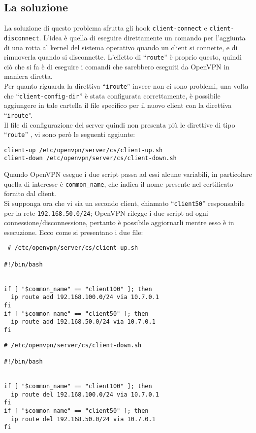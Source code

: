 \subsection{La soluzione}
La soluzione di questo problema sfrutta gli hook \texttt{client-connect} e
\texttt{client-disconnect}. L'idea è
quella di eseguire direttamente un comando per l'aggiunta di una rotta al
kernel del sistema operativo quando un client si connette, e di rimuoverla quando
si disconnette. L'effetto di ``\texttt{route}'' è proprio questo, quindi ciò che si fa
è di eseguire i comandi che sarebbero eseguiti da OpenVPN in maniera diretta.\\
Per quanto riguarda la direttiva ``\texttt{iroute}'' invece non ci sono problemi,
una volta che ``\texttt{client-config-dir}'' è stata configurata correttamente, è
possibile aggiungere in tale cartella il file specifico per il nuovo client con la
direttiva ``\texttt{iroute}''.\\
Il file di configurazione del server quindi non presenta più le direttive
di tipo ``\texttt{route}'' %
, vi sono però le seguenti aggiunte:
\begin{verbatim}
client-up /etc/openvpn/server/cs/client-up.sh
client-down /etc/openvpn/server/cs/client-down.sh
\end{verbatim}
Quando OpenVPN esegue i due script passa ad essi alcune variabili, in particolare
quella di interesse è \texttt{common\_name}, che indica il nome
presente nel certificato fornito dal client.\\
Si supponga ora che vi sia un secondo
client, chiamato ``\texttt{client50}'' responsabile per la rete \texttt{192.168.50.0/24};
OpenVPN rilegge i due script ad ogni connessione/disconnessione, pertanto è possibile
aggiornarli mentre esso è in esecuzione.
Ecco come si presentano i due file:
\begin{verbatim}
 # /etc/openvpn/server/cs/client-up.sh

#!/bin/bash


if [ "$common_name" == "client100" ]; then
  ip route add 192.168.100.0/24 via 10.7.0.1
fi
if [ "$common_name" == "client50" ]; then
  ip route add 192.168.50.0/24 via 10.7.0.1
fi
\end{verbatim}
\begin{verbatim}
# /etc/openvpn/server/cs/client-down.sh

#!/bin/bash


if [ "$common_name" == "client100" ]; then
  ip route del 192.168.100.0/24 via 10.7.0.1
fi
if [ "$common_name" == "client50" ]; then
  ip route del 192.168.50.0/24 via 10.7.0.1
fi
\end{verbatim}
